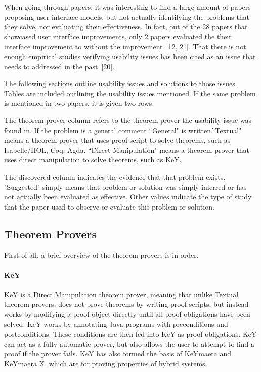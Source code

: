 \documentclass[
]{article}
\begin{document}
When going through papers, it was interesting to find a large amount of
papers proposing user interface models, but not actually identifying the
problems that they solve, nor evaluating their effectiveness. In fact,
out of the 28 papers that showcased user interface improvements, only 2
papers evaluated the their interface improvement to without the
improvement~{[}\protect\hyperlink{ref-berman_development_2014}{12},
\protect\hyperlink{ref-hentschel_empirical_2016}{21}{]}. That there is
not enough empirical studies verifying usability issues has been cited
as an issue that needs to addressed in the
past~{[}\protect\hyperlink{ref-hahnle_deductive_2019}{20}{]}.

The following sections outline usability issues and solutions to those
issues. Tables are included outlining the usability issues mentioned. If
the same problem is mentioned in two papers, it is given two rows.

The theorem prover column refers to the theorem prover the usability
issue was found in. If the problem is a general comment ``General" is
written.''Textual" means a theorem prover that uses proof script to
solve theorems, such as Isabelle/HOL, Coq, Agda. ``Direct Manipulation"
means a theorem prover that uses direct manipulation to solve theorems,
such as KeY.

The discovered column indicates the evidence that that problem exists.
"Suggested" simply means that problem or solution was simply inferred or
has not actually been evaluated as effective. Other values indicate the
type of study that the paper used to observe or evaluate this problem or
solution.

\hypertarget{theorem-provers}{%
\subsection{Theorem Provers}\label{theorem-provers}}

First of all, a brief overview of the theorem provers is in order.

\hypertarget{key}{%
\paragraph{KeY}\label{key}}

KeY is a Direct Manipulation theorem prover, meaning that unlike Textual
theorem provers, does not prove theorems by writing proof scripts, but
instead works by modifying a proof object directly until all proof
obligations have been solved. KeY works by annotating Java programs with
preconditions and postconditions. These conditions are then fed into KeY
as proof obligations. KeY can act as a fully automatic prover, but also
allows the user to attempt to find a proof if the prover fails. KeY has
also formed the basis of KeYmaera and KeYmaera X, which are for proving
properties of hybrid systems.
\end{document}
